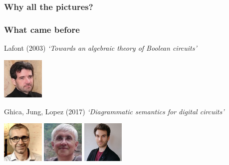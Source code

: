 \begin{frame}
    \frametitle{Why all the pictures?}
    \centering

    \Huge


\end{frame}
\begin{frame}
    \frametitle{What came before}

    \pause
    \alert{Lafont (2003)}
    \emph{`Towards an algebraic theory of Boolean circuits'}

    \includegraphics[width=0.15\textwidth]{imgs/lafont}

    \vspace{0.5em}
    \pause

    \alert{Ghica, Jung, Lopez (2017)}
    \emph{`Diagrammatic semantics for digital circuits'}

    \includegraphics[width=0.15\textwidth]{imgs/ghica}
    \includegraphics[width=0.15\textwidth]{imgs/achim}
    \includegraphics[width=0.15\textwidth]{imgs/lopez}
\end{frame}

